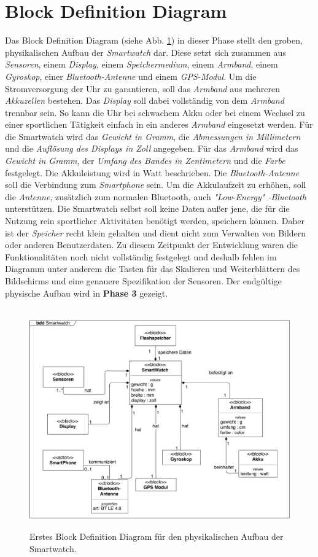 \section{Block Definition Diagram}
\label{sec:blockdefinitiondiagram}

Das Block Definition Diagram (siehe Abb. \ref{fig:block1}) in dieser Phase stellt den groben, physikalischen Aufbau der \textit{Smartwatch} dar. Diese setzt sich zusammen aus \textit{Sensoren}, einem \textit{Display}, einem \textit{Speichermedium}, einem \textit{Armband}, einem \textit{Gyroskop}, einer \textit{Bluetooth-Antenne} und einem \textit{GPS-Modul}. Um die Stromversorgung der Uhr zu garantieren, soll das \textit{Armband} aus mehreren \textit{Akkuzellen} bestehen. Das \textit{Display} soll dabei vollständig von dem \textit{Armband} trennbar sein. So kann die Uhr bei schwachem Akku oder bei einem Wechsel zu einer sportlichen Tätigkeit einfach in ein anderes \textit{Armband} eingesetzt werden. Für die Smartwatch wird das \textit{Gewicht in Gramm}, die \textit{Abmessungen in Millimetern} und die \textit{Auflösung des Displays in Zoll} angegeben. Für das \textit{Armband} wird das \textit{Gewicht in Gramm}, der \textit{Umfang des Bandes in Zentimetern} und die \textit{Farbe} festgelegt. Die Akkuleistung wird in Watt beschrieben. Die \textit{Bluetooth-Antenne} soll die Verbindung zum \textit{Smartphone} sein. Um die Akkulaufzeit zu erhöhen, soll die \textit{Antenne}, zusätzlich zum normalen Bluetooth, auch \textit{"Low-Energy" -Bluetooth} unterstützen. Die Smartwatch selbst soll keine Daten außer jene, die für die Nutzung rein sportlicher Aktivitäten benötigt werden, speichern können. Daher ist der \textit{Speicher} recht klein gehalten und dient nicht zum Verwalten von Bildern oder anderen Benutzerdaten.
Zu diesem Zeitpunkt der Entwicklung waren die Funktionalitäten noch nicht vollständig festgelegt und deshalb fehlen im Diagramm unter anderem die Tasten für das Skalieren und Weiterblättern des Bildschirms und eine genauere Spezifikation der Sensoren. Der endgültige physische Aufbau wird in \textbf{Phase 3} gezeigt.

\begin{figure}[h]
\centering\
\includegraphics[width=\textwidth]{img/block1}
\caption[Block Definition Diagram der Phase 1]{Erstes Block Definition Diagram für den physikalischen Aufbau der Smartwatch.}\label{fig:block1}
\end{figure}